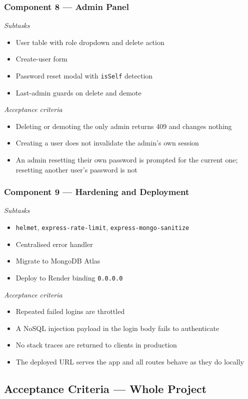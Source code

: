\documentclass[11pt,letterpaper]{article}
\begin{document}
\subsubsection*{Component 8 --- Admin Panel}
\textit{Subtasks}
\begin{itemize}
  \item User table with role dropdown and delete action
  \item Create-user form
  \item Password reset modal with \texttt{isSelf} detection
  \item Last-admin guards on delete and demote
\end{itemize}
\textit{Acceptance criteria}
\begin{itemize}
  \item Deleting or demoting the only admin returns 409 and changes nothing
  \item Creating a user does not invalidate the admin's own session
  \item An admin resetting their own password is prompted for the current one;
        resetting another user's password is not
\end{itemize}

\subsubsection*{Component 9 --- Hardening and Deployment}
\textit{Subtasks}
\begin{itemize}
  \item \texttt{helmet}, \texttt{express-rate-limit}, \texttt{express-mongo-sanitize}
  \item Centralised error handler
  \item Migrate to MongoDB Atlas
  \item Deploy to Render binding \texttt{0.0.0.0}
\end{itemize}
\textit{Acceptance criteria}
\begin{itemize}
  \item Repeated failed logins are throttled
  \item A NoSQL injection payload in the login body fails to authenticate
  \item No stack traces are returned to clients in production
  \item The deployed URL serves the app and all routes behave as they do locally
\end{itemize}

\subsection{Acceptance Criteria --- Whole Project}
\end{document}
